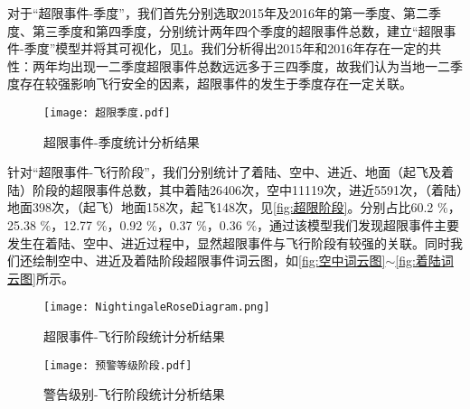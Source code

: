 \documentclass{MathorCupModeling}
\begin{document}
	对于“超限事件-季度”，我们首先分别选取2015年及2016年的第一季度、第二季度、第三季度和第四季度，分别统计两年四个季度的超限事件总数，建立“超限事件-季度”模型并将其可视化，见\textcolor{blue}{\cref{fig:超限季度}}。我们分析得出2015年和2016年存在一定的共性：两年均出现一二季度超限事件总数远远多于三四季度，故我们认为当地一二季度存在较强影响飞行安全的因素，超限事件的发生于季度存在一定关联。
	\begin{figure}[H]
		\centering
		\texttt{[image: 超限季度.pdf]}
		\caption{超限事件-季度统计分析结果}
		\label{fig:超限季度}
	\end{figure}
	针对“超限事件-飞行阶段”，我们分别统计了着陆、空中、进近、地面（起飞及着陆）阶段的超限事件总数，其中着陆26406次，空中11119次，进近5591次，（着陆）地面398次，（起飞）地面158次，起飞148次，见\textcolor{blue}{\cref{fig:超限阶段}}。分别占比60.2 \%，25.38 \%，12.77 \%，0.92 \%，0.37 \%，0.36 \%，通过该模型我们发现超限事件主要发生在着陆、空中、进近过程中，显然超限事件与飞行阶段有较强的关联。同时我们还绘制空中、进近及着陆阶段超限事件词云图，如\textcolor{blue}{\cref{fig:空中词云图}}$\sim$\textcolor{blue}{\cref{fig:着陆词云图}}所示。
	\begin{figure}[H]
		\centering
		\begin{minipage}{0.48\linewidth}
			\centering
			\texttt{[image: NightingaleRoseDiagram.png]}
			\caption{超限事件-飞行阶段统计分析结果}
			\label{fig:超限阶段}
		\end{minipage}
		\begin{minipage}{0.48\linewidth}
			\centering
			\texttt{[image: 预警等级阶段.pdf]}
			\caption{警告级别-飞行阶段统计分析结果}
			\label{fig:预警等级阶段}
		\end{minipage}
	\end{figure}
\end{document}
